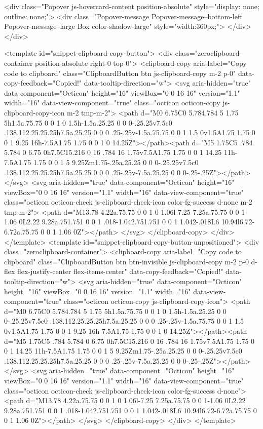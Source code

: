 {{{{{    <div class="Popover js-hovercard-content position-absolute" style="display: none; outline: none;">
  <div class="Popover-message Popover-message--bottom-left Popover-message--large Box color-shadow-large" style="width:360px;">
  </div>
</div>

    <template id="snippet-clipboard-copy-button">
  <div class="zeroclipboard-container position-absolute right-0 top-0">
    <clipboard-copy aria-label="Copy code to clipboard" class="ClipboardButton btn js-clipboard-copy m-2 p-0" data-copy-feedback="Copied!" data-tooltip-direction="w">
      <svg aria-hidden="true" data-component="Octicon" height="16" viewBox="0 0 16 16" version="1.1" width="16" data-view-component="true" class="octicon octicon-copy js-clipboard-copy-icon m-2 tmp-m-2">
    <path d="M0 6.75C0 5.784.784 5 1.75 5h1.5a.75.75 0 0 1 0 1.5h-1.5a.25.25 0 0 0-.25.25v7.5c0 .138.112.25.25.25h7.5a.25.25 0 0 0 .25-.25v-1.5a.75.75 0 0 1 1.5 0v1.5A1.75 1.75 0 0 1 9.25 16h-7.5A1.75 1.75 0 0 1 0 14.25Z"></path><path d="M5 1.75C5 .784 5.784 0 6.75 0h7.5C15.216 0 16 .784 16 1.75v7.5A1.75 1.75 0 0 1 14.25 11h-7.5A1.75 1.75 0 0 1 5 9.25Zm1.75-.25a.25.25 0 0 0-.25.25v7.5c0 .138.112.25.25.25h7.5a.25.25 0 0 0 .25-.25v-7.5a.25.25 0 0 0-.25-.25Z"></path>
</svg>
      <svg aria-hidden="true" data-component="Octicon" height="16" viewBox="0 0 16 16" version="1.1" width="16" data-view-component="true" class="octicon octicon-check js-clipboard-check-icon color-fg-success d-none m-2 tmp-m-2">
    <path d="M13.78 4.22a.75.75 0 0 1 0 1.06l-7.25 7.25a.75.75 0 0 1-1.06 0L2.22 9.28a.751.751 0 0 1 .018-1.042.751.751 0 0 1 1.042-.018L6 10.94l6.72-6.72a.75.75 0 0 1 1.06 0Z"></path>
</svg>
    </clipboard-copy>
  </div>
</template>
<template id="snippet-clipboard-copy-button-unpositioned">
  <div class="zeroclipboard-container">
    <clipboard-copy aria-label="Copy code to clipboard" class="ClipboardButton btn btn-invisible js-clipboard-copy m-2 p-0 d-flex flex-justify-center flex-items-center" data-copy-feedback="Copied!" data-tooltip-direction="w">
      <svg aria-hidden="true" data-component="Octicon" height="16" viewBox="0 0 16 16" version="1.1" width="16" data-view-component="true" class="octicon octicon-copy js-clipboard-copy-icon">
    <path d="M0 6.75C0 5.784.784 5 1.75 5h1.5a.75.75 0 0 1 0 1.5h-1.5a.25.25 0 0 0-.25.25v7.5c0 .138.112.25.25.25h7.5a.25.25 0 0 0 .25-.25v-1.5a.75.75 0 0 1 1.5 0v1.5A1.75 1.75 0 0 1 9.25 16h-7.5A1.75 1.75 0 0 1 0 14.25Z"></path><path d="M5 1.75C5 .784 5.784 0 6.75 0h7.5C15.216 0 16 .784 16 1.75v7.5A1.75 1.75 0 0 1 14.25 11h-7.5A1.75 1.75 0 0 1 5 9.25Zm1.75-.25a.25.25 0 0 0-.25.25v7.5c0 .138.112.25.25.25h7.5a.25.25 0 0 0 .25-.25v-7.5a.25.25 0 0 0-.25-.25Z"></path>
</svg>
      <svg aria-hidden="true" data-component="Octicon" height="16" viewBox="0 0 16 16" version="1.1" width="16" data-view-component="true" class="octicon octicon-check js-clipboard-check-icon color-fg-success d-none">
    <path d="M13.78 4.22a.75.75 0 0 1 0 1.06l-7.25 7.25a.75.75 0 0 1-1.06 0L2.22 9.28a.751.751 0 0 1 .018-1.042.751.751 0 0 1 1.042-.018L6 10.94l6.72-6.72a.75.75 0 0 1 1.06 0Z"></path>
</svg>
    </clipboard-copy>
  </div>
</template>


}}}}}
